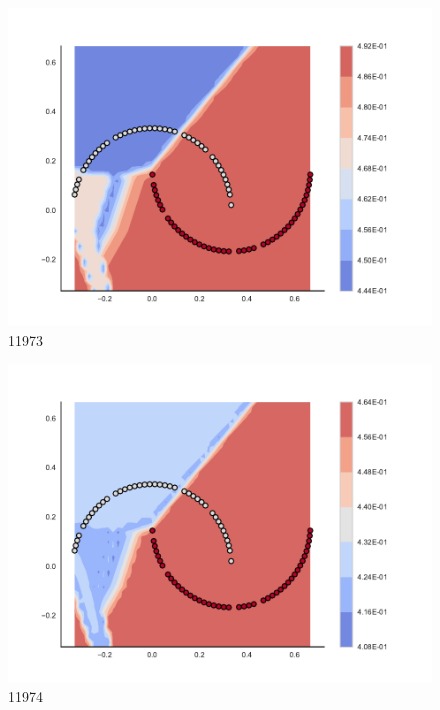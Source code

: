 \begin{subfigure}[b]{0.09\textwidth}
    \includegraphics[clip, trim=2.35cm 1.75cm 4.5cm 0cm,width=\textwidth]{img/convergence/11973.pdf}
    \caption{11973}
    \label{fig:convergence_11973}
\end{subfigure}
%
\begin{subfigure}[b]{0.09\textwidth}
    \includegraphics[clip, trim=2.35cm 1.75cm 4.5cm 0cm,width=\textwidth]{img/convergence/11974.pdf}
    \caption{11974}
    \label{fig:convergence_11974}
\end{subfigure}
%

